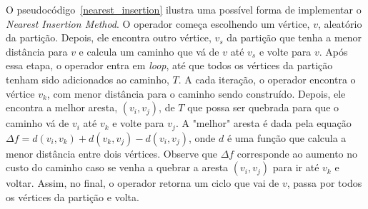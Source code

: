 O pseudocódigo~\ref{nearest_insertion} ilustra uma possível forma de implementar 
o \textit{Nearest Insertion Method}. O operador começa escolhendo um vértice, 
$v$, aleatório da partição. Depois, ele encontra outro vértice, $v_{s}$ da 
partição que tenha a menor distância para $v$ e calcula um caminho que vá de $v$ 
até $v_{s}$ e volte para $v$. Após essa etapa, o operador entra em 
\textit{loop}, até que todos os vértices da partição tenham sido adicionados ao 
caminho, $T$. A cada iteração, o operador encontra o vértice $v_{k}$, com menor 
distância para o caminho sendo construído. Depois, ele encontra a melhor aresta, 
$(v_{i}, v_{j})$, de $T$ que possa ser quebrada para que o caminho vá de $v_{i}$ 
até $v_{k}$ e volte para $v_{j}$. A "melhor" aresta é dada pela equação 
$\Delta f = d(v_{i}, v_{k}) + d(v_{k}, v_{j}) - d(v_{i}, v_{j})$, onde $d$ é uma 
função que calcula a menor distância entre dois vértices.  Observe que 
$\Delta f$ corresponde ao aumento no custo do caminho caso se venha a quebrar a 
aresta $(v_{i}, v_{j})$ para ir até $v_{k}$ e voltar. Assim, no final, o 
operador retorna um ciclo que vai de $v$, passa por todos os vértices da 
partição e volta.

